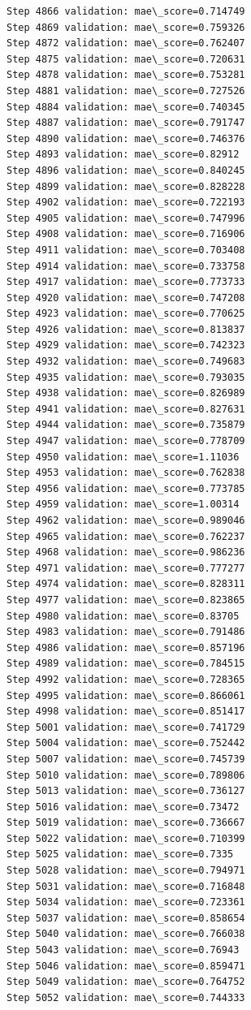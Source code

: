 \documentclass[11pt]{article}
\begin{document}
\begin{Verbatim}[commandchars=\\\{\}]
Step 4866 validation: mae\_score=0.714749
Step 4869 validation: mae\_score=0.759326
Step 4872 validation: mae\_score=0.762407
Step 4875 validation: mae\_score=0.720631
Step 4878 validation: mae\_score=0.753281
Step 4881 validation: mae\_score=0.727526
Step 4884 validation: mae\_score=0.740345
Step 4887 validation: mae\_score=0.791747
Step 4890 validation: mae\_score=0.746376
Step 4893 validation: mae\_score=0.82912
Step 4896 validation: mae\_score=0.840245
Step 4899 validation: mae\_score=0.828228
Step 4902 validation: mae\_score=0.722193
Step 4905 validation: mae\_score=0.747996
Step 4908 validation: mae\_score=0.716906
Step 4911 validation: mae\_score=0.703408
Step 4914 validation: mae\_score=0.733758
Step 4917 validation: mae\_score=0.773733
Step 4920 validation: mae\_score=0.747208
Step 4923 validation: mae\_score=0.770625
Step 4926 validation: mae\_score=0.813837
Step 4929 validation: mae\_score=0.742323
Step 4932 validation: mae\_score=0.749683
Step 4935 validation: mae\_score=0.793035
Step 4938 validation: mae\_score=0.826989
Step 4941 validation: mae\_score=0.827631
Step 4944 validation: mae\_score=0.735879
Step 4947 validation: mae\_score=0.778709
Step 4950 validation: mae\_score=1.11036
Step 4953 validation: mae\_score=0.762838
Step 4956 validation: mae\_score=0.773785
Step 4959 validation: mae\_score=1.00314
Step 4962 validation: mae\_score=0.989046
Step 4965 validation: mae\_score=0.762237
Step 4968 validation: mae\_score=0.986236
Step 4971 validation: mae\_score=0.777277
Step 4974 validation: mae\_score=0.828311
Step 4977 validation: mae\_score=0.823865
Step 4980 validation: mae\_score=0.83705
Step 4983 validation: mae\_score=0.791486
Step 4986 validation: mae\_score=0.857196
Step 4989 validation: mae\_score=0.784515
Step 4992 validation: mae\_score=0.728365
Step 4995 validation: mae\_score=0.866061
Step 4998 validation: mae\_score=0.851417
Step 5001 validation: mae\_score=0.741729
Step 5004 validation: mae\_score=0.752442
Step 5007 validation: mae\_score=0.745739
Step 5010 validation: mae\_score=0.789806
Step 5013 validation: mae\_score=0.736127
Step 5016 validation: mae\_score=0.73472
Step 5019 validation: mae\_score=0.736667
Step 5022 validation: mae\_score=0.710399
Step 5025 validation: mae\_score=0.7335
Step 5028 validation: mae\_score=0.794971
Step 5031 validation: mae\_score=0.716848
Step 5034 validation: mae\_score=0.723361
Step 5037 validation: mae\_score=0.858654
Step 5040 validation: mae\_score=0.766038
Step 5043 validation: mae\_score=0.76943
Step 5046 validation: mae\_score=0.859471
Step 5049 validation: mae\_score=0.764752
Step 5052 validation: mae\_score=0.744333

\end{Verbatim}
\end{document}
